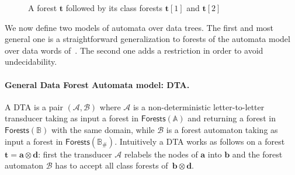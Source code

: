 \documentclass{CSML}
\newcommand\wdad{\textup{DTA}\xspace}
\newcommand\A{\ensuremath{\mathbb{A}}\xspace}
\newcommand\B{\mathbb{B}}
\newcommand\Aa{\mathcal{A}}
\newcommand\Ba{\mathcal{B}}
\newcommand\Forests{\mathsf{Forests}}
\newcommand\tree{\boldsymbol{t}}
\newcommand\atree{\boldsymbol{a}}
\newcommand\btree{\boldsymbol{b}}
\newcommand\dtree{\boldsymbol{d}}
\begin{document}
\begin{figure}[h!]
\hspace{-8.7 cm}
  \caption{A forest $\tree$ followed by its class forests
    $\tree[1]$ and $\tree[2]$}
  \label{fig-class-forest}
\end{figure}

\noindent We now define two models of automata over data trees. The first and most general
one is a straightforward generalization to forests of the automata model over
data words of~\cite{BDMSS11}. The second one adds a restriction in order to
avoid undecidability.

\paragraph{General Data Forest Automata model: \wdad.}  
A \wdad is a pair $(\Aa,\Ba)$ where $\Aa$ is a non-deterministic
letter-to-letter transducer taking as input a forest in $\Forests(\A)$ and
returning a forest in $\Forests(\B)$ with the same domain, while $\Ba$ is a
forest automaton taking as input a forest in $\Forests(\B_\#)$. Intuitively a
\wdad works as follows on a forest $\tree=\atree\otimes\dtree$: first the
transducer $\Aa$ relabels the nodes of $\atree$ into $\btree$ and the forest
automaton $\Ba$ has to accept all class forests of~$\btree\otimes\dtree$. 
\end{document}
